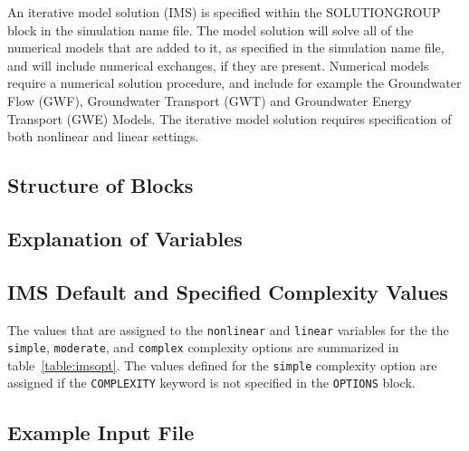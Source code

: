 An iterative model solution (IMS) is specified within the SOLUTIONGROUP block in the simulation name file.  The model solution will solve all of the numerical models that are added to it, as specified in the simulation name file, and will include numerical exchanges, if they are present.  Numerical models require a numerical solution procedure, and include for example the Groundwater Flow (GWF), Groundwater Transport (GWT) and Groundwater Energy Transport (GWE) Models.  The iterative model solution requires specification of both nonlinear and linear settings.  

\vspace{5mm}
\subsection{Structure of Blocks}




\vspace{5mm}
\subsection{Explanation of Variables}
\begin{description}

\end{description}

\subsection{IMS Default and Specified Complexity Values}

The values that are assigned to the \texttt{nonlinear} and \texttt{linear} variables for the the \texttt{simple}, \texttt{moderate}, and \texttt{complex} complexity options are summarized in table~\ref{table:imsopt}. The values defined for the \texttt{simple} complexity option are assigned if the \texttt{COMPLEXITY} keyword is not specified in the \texttt{OPTIONS} block.

\begin{table}[H]
	\caption{IMS variable values for the available complexity options}
	
	\label{table:imsopt}
\end{table}

\vspace{5mm}
\subsection{Example Input File}


